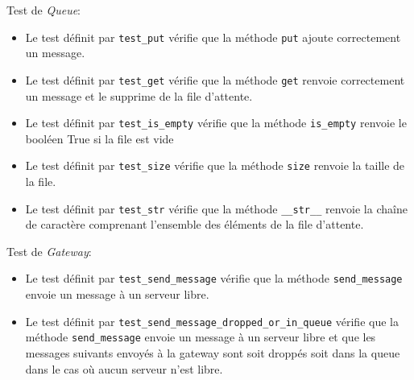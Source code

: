 \documentclass[11pt,a4paper]{article}
\begin{document}
\bigskip

Test de \emph{Queue}:
\begin{itemize}
    \item Le test définit par \lstinline|test_put| vérifie que la méthode \lstinline|put| ajoute correctement un message.
    \item Le test définit par \lstinline|test_get| vérifie que la méthode \lstinline|get| renvoie correctement un message et le supprime de la file d'attente.
    \item Le test définit par \lstinline|test_is_empty| vérifie que la méthode \lstinline|is_empty| renvoie le booléen True si la file est vide
    \item Le test définit par \lstinline|test_size| vérifie que la méthode \lstinline|size| renvoie la taille de la file.
    \item Le test définit par \lstinline|test_str| vérifie que la méthode \lstinline|__str__| renvoie la chaîne de caractère comprenant l'ensemble des éléments de la file d'attente.
\end{itemize}

\bigskip


Test de \emph{Gateway}:
\begin{itemize}
    \item Le test définit par \lstinline|test_send_message| vérifie que la méthode \lstinline|send_message| envoie un message à un serveur libre.
    \item Le test définit par \lstinline|test_send_message_dropped_or_in_queue| vérifie que la méthode \lstinline|send_message| envoie un message à un serveur libre et que les messages suivants envoyés à la gateway sont soit droppés soit dans la queue dans le cas où aucun serveur n'est libre.
\end{itemize}

\bigskip
\end{document}
